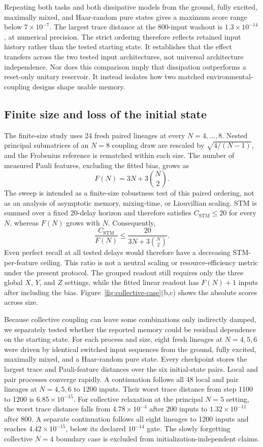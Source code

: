 Repeating both tasks and both dissipative models from the ground, fully
excited, maximally mixed, and Haar-random pure states gives a maximum score
range below \(7\times10^{-7}\). The largest trace distance at the 800-input
washout is \(1.3\times10^{-14}\), at numerical precision. The strict ordering
therefore reflects retained input history rather than the tested starting
state. It establishes that the effect transfers across the two tested input
architectures, not universal architecture independence. Nor does this
comparison imply that dissipation outperforms a reset-only unitary reservoir.
It instead isolates how two matched environmental-coupling designs shape usable memory.

\subsection{Finite size and loss of the initial state}

The finite-size study uses 24 fresh paired lineages at every
\(N=4,\ldots,8\).  Nested principal submatrices of an \(N=8\) coupling draw
are rescaled by \(\sqrt{4/(N-1)}\), and the Frobenius reference is rematched
within each size.  The number of measured Pauli features, excluding the fitted
bias, grows as
\[
F(N)=3N+3\binom{N}{2}.
\]
The sweep is intended as a finite-size robustness test of this paired ordering,
not as an analysis of asymptotic memory,
mixing-time, or Liouvillian scaling. STM is summed over a fixed 20-delay
horizon and therefore satisfies \(C_{\mathrm{STM}}\leq 20\) for every \(N\),
whereas \(F(N)\) grows with \(N\). Consequently,
\[
  \frac{C_{\mathrm{STM}}}{F(N)}
  \leq \frac{20}{3N+3\binom{N}{2}}.
\]
Even perfect recall at all tested delays would therefore have a decreasing
STM-per-feature ceiling. This ratio is not a neutral scaling or
resource-efficiency metric under the present protocol. The grouped readout
still requires only the three global \(X\), \(Y\), and \(Z\) settings, while
the fitted linear readout has \(F(N)+1\) inputs after including the bias.
Figure~\ref{fig:collective-case}(b,c) shows the absolute scores across size.

Because collective coupling can leave some combinations only indirectly
damped, we separately tested whether the reported memory could be residual
dependence on the starting state.  For each process and size, eight fresh
lineages at \(N=4,5,6\) were driven by identical switched input sequences from
the ground, fully excited, maximally mixed, and a Haar-random pure state.
Every checkpoint stores the largest trace and Pauli-feature distances over
the six initial-state pairs. Local and pair processes converge rapidly. A
continuation follows all 48 local and pair lineages at
\(N=4,5,6\) to 1200 inputs. Their worst trace distance from step 1100 to 1200
is \(6.85\times10^{-15}\).
For collective relaxation at the principal \(N=5\)
setting, the worst trace distance falls from \(4.78\times10^{-4}\) after 200
inputs to \(1.32\times10^{-11}\) after 800. A separate continuation
follows all eight lineages to 1200 inputs and reaches
\(4.42\times10^{-15}\), below its declared \(10^{-14}\) gate. The slowly
forgetting collective \(N=4\) boundary case is excluded from
initialization-independent claims.

